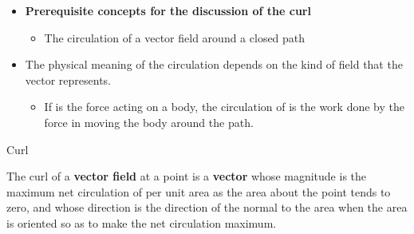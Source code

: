\ELhold


\begin{ELunit}

\begin{itemize}
\tightlist
\item
  \textbf{Prerequisite concepts for the discussion of the curl}

  \begin{itemize}
  \tightlist
  \item
    The circulation of a vector field around a closed path
  \end{itemize}
\end{itemize}


\end{ELunit}

\begin{ELjoin}

\begin{itemize}
\tightlist
\item
  The physical meaning of the circulation depends on the kind of field that the vector  represents.

  \begin{itemize}
  \tightlist
  \item
    If  is the force acting on a body, the circulation of  is the work done by the force in moving the body around the path.
  \end{itemize}
\end{itemize}

\begin{ELdefinition}{Curl}

The curl of a \textbf{vector field}  at a point is a \textbf{vector} whose magnitude is the maximum net circulation of  per unit area as the area about the point tends to zero, and whose direction is the direction of the normal to the area when the area is oriented so as to make the net circulation maximum.


\end{ELdefinition}

\end{ELjoin}

